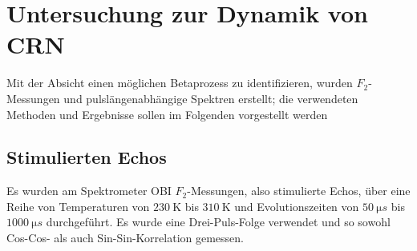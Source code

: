 \section{Untersuchung zur Dynamik von CRN} \label{section:res:F_2}

Mit der Absicht einen möglichen Betaprozess zu identifizieren, wurden $F_2$-Messungen und pulslängenabhängige Spektren erstellt; die verwendeten Methoden und Ergebnisse sollen im Folgenden vorgestellt werden

\subsection{Stimulierten Echos} \label{section:res:stimechos}

Es wurden am Spektrometer OBI $F_2$-Messungen, also stimulierte Echos, über eine Reihe von Temperaturen von $\SI{230}{\kelvin}$ bis $\SI{310}{\kelvin}$ und Evolutionszeiten von $\SI{50}{\micro s}$ bis $\SI{1000}{\micro s}$ durchgeführt. Es wurde eine Drei-Puls-Folge verwendet und so sowohl Cos-Cos- als auch Sin-Sin-Korrelation gemessen.

